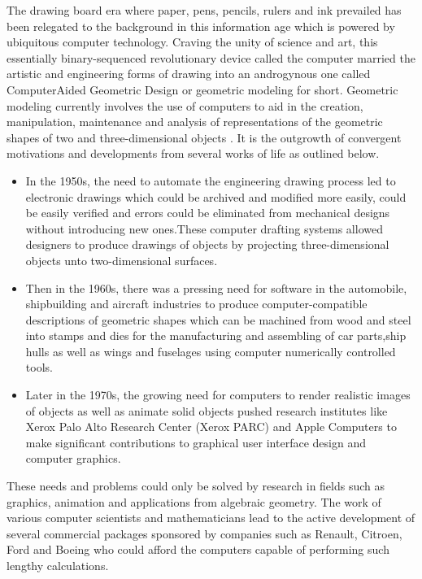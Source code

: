 \hspace{30}The drawing board era where paper, pens, pencils, rulers and ink  
prevailed has been relegated to the background in this information age which is  
powered by ubiquitous computer technology. Craving the unity of science and  
art, this essentially binary­-sequenced revolutionary device called the computer  
married the artistic and engineering forms of drawing into an androgynous one  
called Computer­Aided Geometric Design or geometric modeling for short.
Geometric modeling currently involves the use of computers to aid in the  
creation, manipulation, maintenance and analysis of representations of the  
geometric shapes of two and three-­dimensional objects \cite{2}. It is the outgrowth  
of convergent motivations and developments from several works of life as  
outlined below.
\begin{itemize}
\item In the 1950s, the need to automate the engineering drawing process led
to electronic drawings which could be archived and modified more easily,
could be easily verified and errors could be eliminated from mechanical 
designs without introducing new ones.These computer drafting systems
allowed designers to produce drawings of objects by projecting
three-­dimensional objects unto two-­dimensional surfaces.
\item Then in the 1960s, there was a pressing need for software in the
automobile, shipbuilding and aircraft industries to produce
computer-­compatible descriptions of geometric shapes which can be
machined from wood and steel into stamps and dies for the
manufacturing and assembling of car parts,ship hulls as well as wings and  
fuselages using computer numerically controlled tools.
\item Later in the 1970s, the growing need for computers to render realistic
images of objects as well as animate solid objects pushed research
institutes like Xerox Palo Alto Research Center (Xerox PARC) and Apple
Computers to make significant contributions to graphical user­ interface
design and computer graphics.  
\end{itemize}

These needs and problems could only be solved by research in fields such as
graphics, animation and applications from algebraic geometry. The work of
various computer scientists and mathematicians lead to the active development
of several commercial packages sponsored by companies such as Renault,
Citroen, Ford and Boeing who could afford the computers capable of  
performing such lengthy calculations.  

